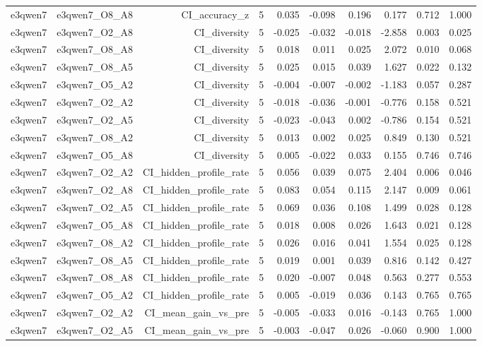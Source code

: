 \documentclass[11pt]{article}
\begin{document}
\begin{landscape}
\begin{longtable}{@{}lrrrrrrrrr@{}}
e3qwen7 & e3qwen7\_O8\_A8 & CI\_accuracy\_z & 5 & 0.035 & -0.098 & 0.196 & 0.177 & 0.712 & 1.000 \\
e3qwen7 & e3qwen7\_O2\_A8 & CI\_diversity & 5 & -0.025 & -0.032 & -0.018 & -2.858 & 0.003 & 0.025 \\
e3qwen7 & e3qwen7\_O8\_A8 & CI\_diversity & 5 & 0.018 & 0.011 & 0.025 & 2.072 & 0.010 & 0.068 \\
e3qwen7 & e3qwen7\_O8\_A5 & CI\_diversity & 5 & 0.025 & 0.015 & 0.039 & 1.627 & 0.022 & 0.132 \\
e3qwen7 & e3qwen7\_O5\_A2 & CI\_diversity & 5 & -0.004 & -0.007 & -0.002 & -1.183 & 0.057 & 0.287 \\
e3qwen7 & e3qwen7\_O2\_A2 & CI\_diversity & 5 & -0.018 & -0.036 & -0.001 & -0.776 & 0.158 & 0.521 \\
e3qwen7 & e3qwen7\_O2\_A5 & CI\_diversity & 5 & -0.023 & -0.043 & 0.002 & -0.786 & 0.154 & 0.521 \\
e3qwen7 & e3qwen7\_O8\_A2 & CI\_diversity & 5 & 0.013 & 0.002 & 0.025 & 0.849 & 0.130 & 0.521 \\
e3qwen7 & e3qwen7\_O5\_A8 & CI\_diversity & 5 & 0.005 & -0.022 & 0.033 & 0.155 & 0.746 & 0.746 \\
e3qwen7 & e3qwen7\_O2\_A2 & CI\_hidden\_profile\_rate & 5 & 0.056 & 0.039 & 0.075 & 2.404 & 0.006 & 0.046 \\
e3qwen7 & e3qwen7\_O2\_A8 & CI\_hidden\_profile\_rate & 5 & 0.083 & 0.054 & 0.115 & 2.147 & 0.009 & 0.061 \\
e3qwen7 & e3qwen7\_O2\_A5 & CI\_hidden\_profile\_rate & 5 & 0.069 & 0.036 & 0.108 & 1.499 & 0.028 & 0.128 \\
e3qwen7 & e3qwen7\_O5\_A8 & CI\_hidden\_profile\_rate & 5 & 0.018 & 0.008 & 0.026 & 1.643 & 0.021 & 0.128 \\
e3qwen7 & e3qwen7\_O8\_A2 & CI\_hidden\_profile\_rate & 5 & 0.026 & 0.016 & 0.041 & 1.554 & 0.025 & 0.128 \\
e3qwen7 & e3qwen7\_O8\_A5 & CI\_hidden\_profile\_rate & 5 & 0.019 & 0.001 & 0.039 & 0.816 & 0.142 & 0.427 \\
e3qwen7 & e3qwen7\_O8\_A8 & CI\_hidden\_profile\_rate & 5 & 0.020 & -0.007 & 0.048 & 0.563 & 0.277 & 0.553 \\
e3qwen7 & e3qwen7\_O5\_A2 & CI\_hidden\_profile\_rate & 5 & 0.005 & -0.019 & 0.036 & 0.143 & 0.765 & 0.765 \\
e3qwen7 & e3qwen7\_O2\_A2 & CI\_mean\_gain\_vs\_pre & 5 & -0.005 & -0.033 & 0.016 & -0.143 & 0.765 & 1.000 \\
e3qwen7 & e3qwen7\_O2\_A5 & CI\_mean\_gain\_vs\_pre & 5 & -0.003 & -0.047 & 0.026 & -0.060 & 0.900 & 1.000 \\

\end{longtable}
\end{landscape}
\end{document}
